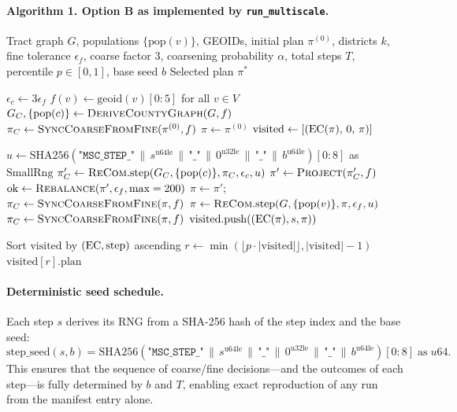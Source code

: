 \paragraph{Algorithm 1. \ms{} Option B as implemented by \texttt{run\_multiscale}.}
\begin{algorithmic}[1]
\Require Tract graph $G$, populations $\{\mathrm{pop}(v)\}$, GEOIDs,
         initial plan $\pi^{(0)}$, districts $k$,
         fine tolerance $\epsilon_f$, coarse factor 3,
         coarsening probability $\alpha$, total steps $T$,
         percentile $p \in [0,1]$, base seed $b$
\Ensure  Selected plan $\pi^*$

\State $\epsilon_c \gets 3 \epsilon_f$
\State $f(v) \gets \mathrm{geoid}(v)[0{:}5]$ for all $v \in V$
\State $G_C, \{\mathrm{pop}(c)\} \gets \textsc{DeriveCountyGraph}(G, f)$
\State $\pi_C \gets \textsc{SyncCoarseFromFine}(\pi^{(0)}, f)$
\State $\pi \gets \pi^{(0)}$
\State $\mathrm{visited} \gets [(\mathrm{EC}(\pi),\,0,\, \pi)]$

  \State $u \gets \mathrm{SHA256}(\texttt{"MSC\_STEP\_"} \,\|\, s^{\mathrm{u64le}}
         \,\|\, \texttt{"\_"} \,\|\, 0^{\mathrm{u32le}} \,\|\, \texttt{"\_"} \,\|\, b^{\mathrm{u64le}})[0{:}8]$
         as $\mathrm{SmallRng}$
    \State $\pi_C' \gets \textsc{ReCom}{}.\mathrm{step}(G_C, \{\mathrm{pop}(c)\}, \pi_C, \epsilon_c, u)$
    \State $\pi' \gets \textsc{Project}(\pi_C', f)$
    \State $\mathrm{ok} \gets \textsc{Rebalance}(\pi', \epsilon_f, \text{max}=200)$
      \State $\pi \gets \pi'$;\quad $\pi_C \gets \textsc{SyncCoarseFromFine}(\pi, f)$
    \EndIf
  \Else
    \State $\pi \gets \textsc{ReCom}{}.\mathrm{step}(G, \{\mathrm{pop}(v)\}, \pi, \epsilon_f, u)$
    \State $\pi_C \gets \textsc{SyncCoarseFromFine}(\pi, f)$
  \EndIf
  \State $\mathrm{visited}.\mathrm{push}((\mathrm{EC}(\pi), s, \pi))$
\EndFor

\State Sort $\mathrm{visited}$ by $(\mathrm{EC},\mathrm{step})$ ascending
\State $r \gets \min(\lfloor p \cdot |\mathrm{visited}|\rfloor, |\mathrm{visited}|-1)$
\State \Return $\mathrm{visited}[r].\mathrm{plan}$
\end{algorithmic}

\paragraph{Deterministic seed schedule.}
Each step $s$ derives its RNG from a SHA-256 hash of the step index and
the base seed:
\[
  \mathrm{step\_seed}(s, b)
  = \mathrm{SHA256}\!\left(\texttt{"MSC\_STEP\_"}
    \,\|\, s^{\mathrm{u64le}}
    \,\|\, \texttt{"\_"}
    \,\|\, 0^{\mathrm{u32le}}
    \,\|\, \texttt{"\_"}
    \,\|\, b^{\mathrm{u64le}}\right)[0{:}8]
    \;\text{as}\; u64.
\]
This ensures that the sequence of coarse/fine decisions---and the outcomes
of each step---is fully determined by $b$ and $T$, enabling exact
reproduction of any run from the manifest entry alone.


